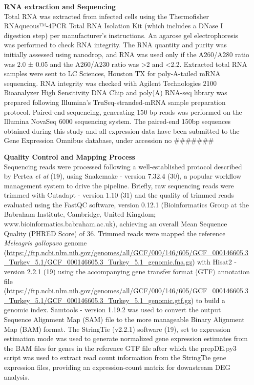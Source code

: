 \documentclass[
]{article}
\begin{document}
\textbf{RNA extraction and Sequencing}\\
Total RNA was extracted from infected cells using the Thermofisher
RNAqueous™-4PCR Total RNA Isolation Kit (which includes a DNase I
digestion step) per manufacturer's instructions. An agarose gel
electrophoresis was performed to check RNA integrity. The RNA quantity
and purity was initially assessed using nanodrop, and RNA was used only
if the A260/A280 ratio was 2.0 ± 0.05 and the A260/A230 ratio was
\textgreater2 and \textless2.2. Extracted total RNA samples were sent to
LC Sciences, Houston TX for poly-A-tailed mRNA sequencing. RNA integrity
was checked with Agilent Technologies 2100 Bioanalyzer High Sensitivity
DNA Chip and poly(A) RNA-seq library was prepared following Illumina's
TruSeq-stranded-mRNA sample preparation protocol. Paired-end sequencing,
generating 150 bp reads was performed on the Illumina NovaSeq 6000
sequencing system. The paired-end 150bp sequences obtained during this
study and all expression data have been submitted to the Gene Expression
Omnibus database, under accession no \#\#\#\#\#\#\#

\textbf{Quality Control and Mapping Process}\\
Sequencing reads were processed following a well-established protocol
described by Pertea \emph{et al} (19), using Snakemake - version 7.32.4
(30), a popular workflow management system to drive the pipeline.
Briefly, raw sequencing reads were trimmed with Cutadapt - version 1.10
(31) and the quality of trimmed reads evaluated using the FastQC
software, version 0.12.1 (Bioinformatics Group at the Babraham
Institute, Cambridge, United Kingdom;
www.bioinformatics.babraham.ac.uk), achieving an overall Mean Sequence
Quality (PHRED Score) of 36. Trimmed reads were mapped the reference
\emph{Meleagris gallopavo} genome
(\url{https://ftp.ncbi.nlm.nih.gov/genomes/all/GCF/000/146/605/GCF_000146605.3_Turkey_5.1/GCF_000146605.3_Turkey_5.1_genomic.fna.gz})
with Hisat2 - version 2.2.1 (19) using the accompanying gene transfer
format (GTF) annotation file
(\url{https://ftp.ncbi.nlm.nih.gov/genomes/all/GCF/000/146/605/GCF_000146605.3_Turkey_5.1/GCF_000146605.3_Turkey_5.1_genomic.gtf.gz})
to build a genomic index. Samtools - version 1.19.2 was used to convert
the output Sequence Alignment Map (SAM) file to the more manageable
Binary Alignment Map (BAM) format. The StringTie (v2.2.1) software (19),
set to expression estimation mode was used to generate normalized gene
expression estimates from the BAM files for genes in the reference GTF
file after which the prepDE.py3 script was used to extract read count
information from the StringTie gene expression files, providing an
expression-count matrix for downstream DEG analysis.
\end{document}
